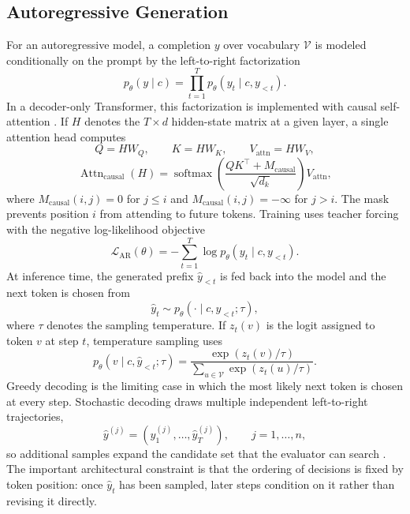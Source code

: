 \subsection{Autoregressive Generation}
For an autoregressive model, a completion $y$ over vocabulary $\mathcal{V}$ is
modeled conditionally on the prompt by the left-to-right factorization
\begin{equation}
    p_\theta(y\mid c)
    =
    \prod_{t=1}^{T}p_\theta(y_t \mid c,y_{<t}).
\end{equation}
In a decoder-only Transformer, this factorization is implemented with causal
self-attention \cite{vaswani2017attention}. If $H$ denotes the $T\times d$
hidden-state matrix at a given layer, a single attention head computes
\begin{equation}
    Q=HW_Q,\qquad K=HW_K,\qquad V_{\mathrm{attn}}=HW_V,
\end{equation}
\begin{equation}
    \operatorname{Attn}_{\mathrm{causal}}(H)
    =
    \operatorname{softmax}\!\left(\frac{QK^\top+M_{\mathrm{causal}}}{\sqrt{d_k}}\right)V_{\mathrm{attn}},
\end{equation}
where $M_{\mathrm{causal}}(i,j)=0$ for $j\leq i$ and
$M_{\mathrm{causal}}(i,j)=-\infty$ for $j>i$. The mask prevents position $i$
from attending to future tokens. Training uses teacher forcing with the
negative log-likelihood objective
\begin{equation}
    \mathcal{L}_{\mathrm{AR}}(\theta)
    =
    -\sum_{t=1}^{T}\log p_\theta(y_t\mid c,y_{<t}).
\end{equation}
At inference time, the generated prefix $\hat{y}_{<t}$ is fed back into the
model and the next token is chosen from
\begin{equation}
    \hat{y}_t \sim p_\theta(\cdot \mid c,\hat{y}_{<t};\tau),
\end{equation}
where $\tau$ denotes the sampling temperature. If $z_t(v)$ is the logit assigned
to token $v$ at step $t$, temperature sampling uses
\begin{equation}
    p_\theta(v\mid c,\hat{y}_{<t};\tau)
    =
    \frac{\exp(z_t(v)/\tau)}
    {\sum_{u\in\mathcal{V}}\exp(z_t(u)/\tau)}.
\end{equation}
Greedy decoding is the limiting case in which the most likely next token is
chosen at every step. Stochastic decoding draws multiple independent
left-to-right trajectories,
\begin{equation}
    \hat{y}^{(j)}
    =
    (\hat{y}^{(j)}_1,\ldots,\hat{y}^{(j)}_T),
    \qquad j=1,\ldots,n,
\end{equation}
so additional samples expand the candidate set that the evaluator can search
\cite{chen2021humaneval}. The important architectural constraint is that the
ordering of decisions is fixed by token position: once $\hat{y}_t$ has been
sampled, later steps condition on it rather than revising it directly.

